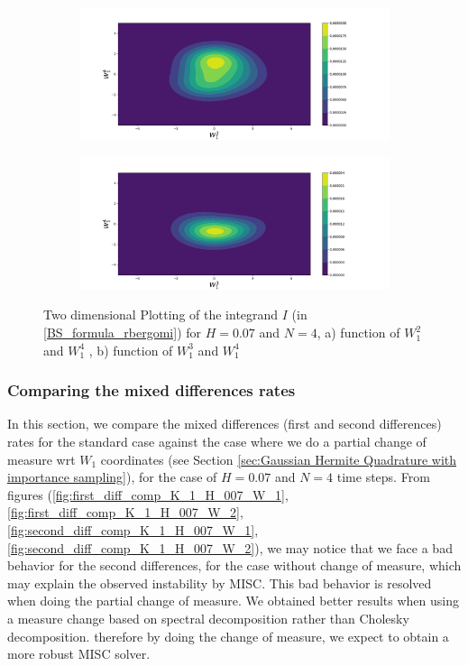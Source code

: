 \documentclass[11pt]{article}
\begin{document}
\begin{figure}[h!]
	\centering
	\begin{subfigure}{.4\textwidth}
		\centering
		\includegraphics[width=1\linewidth]{./figures/integrand_plotting_rBergomi/2D_plots/N_4/H_007/Bergomi_integrand_contours_K_1_H_007_W1_2_4_N_4}
		\caption{}
		\label{fig:sub3}
	\end{subfigure}%
	\begin{subfigure}{.4\textwidth}
		\centering
		\includegraphics[width=1\linewidth]{./figures/integrand_plotting_rBergomi/2D_plots/N_4/H_007/Bergomi_integrand_contours_K_1_H_007_W1_3_4_N_4}
		\caption{}
		\label{fig:sub4}
	\end{subfigure}
	\caption{Two dimensional Plotting of the integrand $I$ (in \eqref{BS_formula_rbergomi})  for $H=0.07$ and $N=4$, a)  function of $W_1^2$ and $W_1^4$ , b) function of $W_1^3$ and $W_1^4$ }
	\label{fig:Integrand_H_007_N_4_2D_W_1_3_3_4}
\end{figure}


\newpage
\subsubsection{Comparing the mixed differences rates}
In this section, we compare the mixed differences (first and second differences) rates for the standard case against the case where we do a partial change of measure wrt $W_1$ coordinates (see Section \ref{sec:Gaussian Hermite Quadrature with importance sampling}), for the case of $H=0.07$ and  $N=4$ time steps. From figures (\ref{fig:first_diff_comp_K_1_H_007_W_1},\ref{fig:first_diff_comp_K_1_H_007_W_2},\ref{fig:second_diff_comp_K_1_H_007_W_1},\ref{fig:second_diff_comp_K_1_H_007_W_2}), we may notice that we face a bad behavior for the second differences, for the case without change of measure, which may explain the observed instability by MISC. This bad behavior is resolved when doing the partial change of measure. We obtained better results when using a measure change based on spectral decomposition rather than Cholesky decomposition. therefore by doing the change of measure, we expect to obtain a more robust MISC solver.
\end{document}
